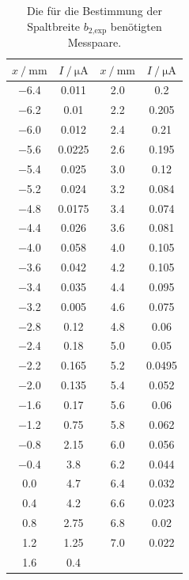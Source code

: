 \begin{table}[H]
\centering
\caption{Die für die Bestimmung der Spaltbreite $b_\text{2,exp}$ benötigten Messpaare.}
\label{tab:einzel2}
\begin{tabular}{c c c c}
\toprule
$x\:/\: \si{\milli\meter}$ & $I\:/\: \si{\micro\ampere}$ &
$x\:/\: \si{\milli\meter}$ & $I\:/\: \si{\micro\ampere}$ \\
\midrule
\num{-6.4} & 0.011 & \num{2.0}  & 0.2 \\
\num{-6.2} & 0.01 & \num{2.2}   & 0.205 \\
\num{-6.0} & 0.012 & \num{2.4}  & 0.21 \\
\num{-5.6} & 0.0225 & \num{2.6} & 0.195 \\
\num{-5.4} & 0.025 & \num{3.0}  & 0.12 \\
\num{-5.2} & 0.024 & \num{3.2}  & 0.084 \\
\num{-4.8} & 0.0175 & \num{3.4} & 0.074 \\
\num{-4.4} & 0.026 & \num{3.6}  & 0.081 \\
\num{-4.0} & 0.058 & \num{4.0}  & 0.105 \\
\num{-3.6} & 0.042 & \num{4.2}  & 0.105 \\
\num{-3.4} & 0.035 & \num{4.4}  & 0.095 \\
\num{-3.2} & 0.005 & \num{4.6}  & 0.075 \\
\num{-2.8} & 0.12 & \num{4.8}   & 0.06 \\
\num{-2.4} & 0.18 & \num{5.0}   & 0.05 \\
\num{-2.2} & 0.165 & \num{5.2}  & 0.0495 \\
\num{-2.0} & 0.135 & \num{5.4}  & 0.052 \\
\num{-1.6} & 0.17 & \num{5.6}   & 0.06 \\
\num{-1.2} & 0.75 & \num{5.8}   & 0.062 \\
\num{-0.8} & 2.15 & \num{6.0}   & 0.056 \\
\num{-0.4} & 3.8 & \num{6.2}    & 0.044 \\
\num{0.0}  & 4.7  & \num{6.4}   & 0.032 \\
\num{0.4}  & 4.2  & \num{6.6}   & 0.023 \\
\num{0.8}  & 2.75  & \num{6.8}  & 0.02 \\
\num{1.2}  & 1.25  & \num{7.0}  & 0.022 \\
\num{1.6}  & 0.4  & & \\
\bottomrule
\end{tabular}
\end{table}

